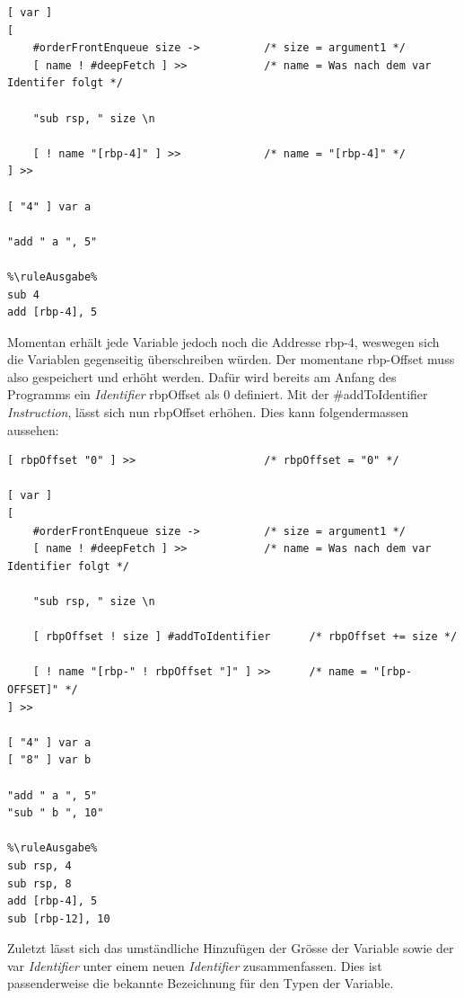 \begin{lstlisting}[language=QHS, caption=Definition einer Variable mit {\selectListingFont var} \textit{Identifier}]
%\ruleEingabe%
[ var ]
[
    #orderFrontEnqueue size ->          /* size = argument1 */
    [ name ! #deepFetch ] >>            /* name = Was nach dem var Identifer folgt */

    "sub rsp, " size \n

    [ ! name "[rbp-4]" ] >>             /* name = "[rbp-4]" */
] >> 

[ "4" ] var a 

"add " a ", 5"
    
%\ruleAusgabe%
sub 4
add [rbp-4], 5
\end{lstlisting}

Momentan erhält jede Variable jedoch noch die Addresse rbp-4, weswegen sich die Variablen gegenseitig überschreiben würden. Der momentane rbp-Offset muss also gespeichert und erhöht werden.
Dafür wird bereits am Anfang des Programms ein \textit{Identifier} rbpOffset als 0 definiert. Mit der {\listingFont\selectfont \#addToIdentifier} \textit{Instruction}, lässt sich nun rbpOffset erhöhen. Dies kann folgendermassen aussehen:

\begin{minipage}{\linewidth}
\begin{lstlisting}[language=QHS, label=eg:qhs-vardefinition, caption=Definition einer Variable mit rbpOffset]
%\ruleEingabe%
[ rbpOffset "0" ] >>                    /* rbpOffset = "0" */

[ var ]
[
    #orderFrontEnqueue size ->          /* size = argument1 */
    [ name ! #deepFetch ] >>            /* name = Was nach dem var Identifier folgt */

    "sub rsp, " size \n

    [ rbpOffset ! size ] #addToIdentifier      /* rbpOffset += size */

    [ ! name "[rbp-" ! rbpOffset "]" ] >>      /* name = "[rbp-OFFSET]" */
] >> 

[ "4" ] var a 
[ "8" ] var b 

"add " a ", 5"
"sub " b ", 10"
    
%\ruleAusgabe%
sub rsp, 4
sub rsp, 8
add [rbp-4], 5
sub [rbp-12], 10
\end{lstlisting}
\end{minipage}

Zuletzt lässt sich das umständliche Hinzufügen der Grösse der Variable sowie der {\selectListingFont var} \textit{Identifier} unter einem neuen \textit{Identifier} zusammenfassen.
Dies ist passenderweise die bekannte Bezeichnung für den Typen der Variable.

